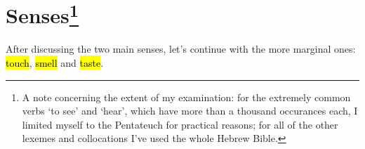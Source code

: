 \section[Senses]{Senses\footnote{A note concerning the extent of my examination: for the extremely common verbs  ‘to see’ and  ‘hear’, which have more than a thousand occurances each, I limited myself to the Pentateuch for practical reasons; for all of the other lexemes and collocations I’ve used the whole Hebrew Bible.}}







\begin{paper}
	After discussing the two main senses, let’s continue with the more marginal ones: \hl{touch}, \hl{smell} and \hl{taste}.
\end{paper}








